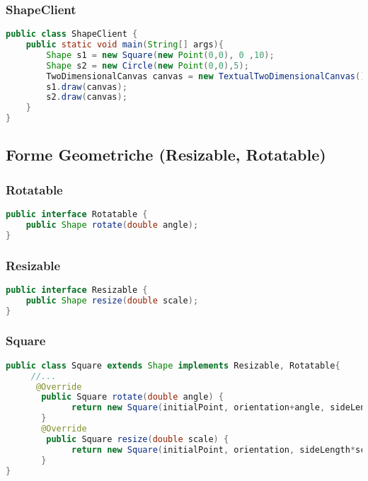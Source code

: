 \documentclass{article}
\begin{document}
\subsubsection{ShapeClient}
\begin{lstlisting}[language=Java,escapechar=|]
public class ShapeClient {
	public static void main(String[] args){
		Shape s1 = new Square(new Point(0,0), 0 ,10);
		Shape s2 = new Circle(new Point(0,0),5);
		TwoDimensionalCanvas canvas = new TextualTwoDimensionalCanvas();
		s1.draw(canvas);
		s2.draw(canvas);
	}
}
\end{lstlisting}





\subsection{Forme Geometriche (Resizable, Rotatable)}

\subsubsection{Rotatable}
\begin{lstlisting}[language=Java,escapechar=|]
public interface Rotatable {
	public Shape rotate(double angle);
}
\end{lstlisting}

\subsubsection{Resizable}
\begin{lstlisting}[language=Java,escapechar=|]
public interface Resizable {
	public Shape resize(double scale);
}
\end{lstlisting}

\subsubsection{Square}

\begin{lstlisting}[language=Java,escapechar=|]
public class Square extends Shape implements Resizable, Rotatable{
     //...
      @Override
       public Square rotate(double angle) {
             return new Square(initialPoint, orientation+angle, sideLength);
       }
       @Override
        public Square resize(double scale) {
             return new Square(initialPoint, orientation, sideLength*scale);
       }
}
\end{lstlisting}
\end{document}
